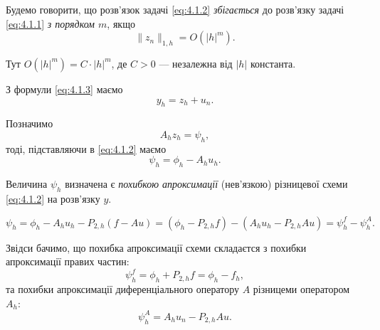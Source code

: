 \begin{definition}
    Будемо говорити, що розв'язок задачі \eqref{eq:4.1.2} \textit{збігається} до розв'язку задачі \eqref{eq:4.1.1} \textit{з порядком $m$}, якщо 
    \begin{equation}
        \label{eq:4.1.4}
        \|z_n\|_{1,h} = O(|h|^m).
    \end{equation}
\end{definition}
\begin{remark}
    Тут $O(|h|^m) = C \cdot |h|^m$, де $C > 0$ --- незалежна від $|h|$ константа.
\end{remark}


З формули \eqref{eq:4.1.3} маємо 
\begin{equation*}
    y_h = z_h + u_n.
\end{equation*}

Позначимо
\begin{equation}
    \label{eq:4.1.5}
    A_h z_h = \psi_h,
\end{equation}
тоді, підставляючи в \eqref{eq:4.1.2} маємо
\begin{equation}
    \label{eq:4.1.6}
    \psi_h = \phi_h - A_h u_h.
\end{equation}

\begin{definition}
    Величина $\psi_h$ визначена є \textit{похибкою апроксимації} (нев'язкою) різницевої схеми \eqref{eq:4.1.2} на розв'язку $y$.
\end{definition}

\begin{equation}
    \label{eq:4.1.7}
    \psi_h = \phi_h - A_h u_h - P_{2, h} (f - A u) = (\phi_h - P_{2, h} f) - (A_h u_h - P_{2, h} A u) = \psi_h^f - \psi_h^A.
\end{equation}

Звідси бачимо, що похибка апроксимації схеми складаєтся з похибки апроксимації правих частин:
\begin{equation}
    \label{eq:4.1.8}
    \psi_h^f = \phi_h + P_{2, h} f = \phi_h - f_h,
\end{equation}
та похибки апроксимації диференціального оператору $A$ різницеми оператором $A_h$:
\begin{equation}
    \label{eq:4.1.9}
    \psi_h^A = A_h u_n - P_{2, h} A u.
\end{equation}

